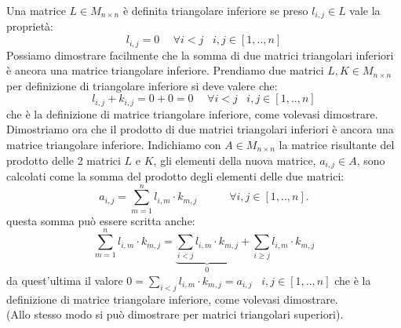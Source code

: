 \begin{flushleft}
Una matrice $L\in M_{n\times n}$ è definita triangolare inferiore se preso $l_{i,j} \in L$ vale la proprietà: 
\[
l_{i,j}=0 \hspace{15pt} \forall i<j \hspace{10pt} i,j \in [1,..,n] 
\]
Possiamo dimostrare facilmente che la somma di due matrici triangolari inferiori è ancora una matrice triangolare inferiore. Prendiamo due matrici $L,K \in M_{n \times n}$ per definizione di triangolare inferiore si deve valere che:
\[
l_{i,j} + k_{i,j} = 0 + 0 = 0 \hspace{15pt} \forall i<j \hspace{10pt} i,j \in [1,..,n] 
\]
che è la definizione di matrice triangolare inferiore, come volevasi dimostrare. \\

Dimostriamo ora che il prodotto di due matrici triangolari inferiori è ancora una matrice triangolare inferiore.
Indichiamo con $A \in M_{n \times n}$ la matrice risultante del prodotto delle 2 matrici $L$ e $K$, gli elementi della nuova matrice, $a_{i,j} \in A$, sono calcolati come la somma del prodotto degli elementi delle due matrici:
\[
a_{i,j} = \sum_{m=1}^n l_{i,m} \cdot k_{m,j} \hspace{35pt} \forall i,j \in [1,..,n].
\]
questa somma può essere scritta anche:
\[
\sum_{m=1}^n l_{i,m} \cdot k_{m,j} =  \underbrace{ \sum_{i<j} l_{i,m} \cdot k_{m,j} }_{0}  + \sum_{i\geq j} l_{i,m}\cdot k_{m,j}
\]
da quest'ultima il valore $0 =\sum_{i<j} l_{i,m} \cdot k_{m,j} = a_{i,j} \hspace{10pt} i,j \in [1,..,n]$ che è la definizione di matrice triangolare inferiore, come volevasi dimostrare. \\

(Allo stesso modo si può dimostrare per matrici triangolari superiori).
\end{flushleft}